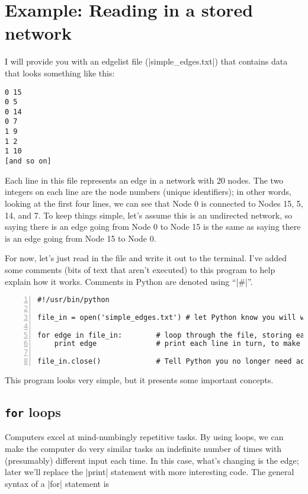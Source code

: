 \documentclass{article}
\begin{document}
\section{Example: Reading in a stored network}
\label{stored_net}
I will provide you with an edgelist file (|simple_edges.txt|) that contains data that looks something
like this:

\begin{Verbatim}
0 15                          
0 5                           
0 14                          
0 7                           
1 9                           
1 2                           
1 10                          
[and so on]
\end{Verbatim}

Each line in this file represents an edge in a network with 20 nodes.  The two integers on
each line are the node numbers (unique identifiers); in other words, looking at the first four lines, we can see that Node 0 is
connected to Nodes 15, 5, 14, and 7.  To keep things simple, let's assume this is an
undirected network, so saying there is an edge going from Node 0 to Node 15 is
the same as saying there is an edge going from Node 15 to Node 0.

For now, let's just read in the file and write it out to the terminal.  I've added some comments (bits of text that
aren't executed) to this program to help explain how it works. Comments in Python are denoted using ``|#|''.

\begin{Verbatim}[numbers=left, samepage=true]
#!/usr/bin/python

file_in = open('simple_edges.txt') # let Python know you will want to access the file

for edge in file_in:        # loop through the file, storing each line in turn in 'edge'
    print edge              # print each line in turn, to make sure everything's working

file_in.close()             # Tell Python you no longer need access
\end{Verbatim}
This program looks very simple, but it presents some important concepts.

\subsection{\texttt{for} loops}
Computers excel at mind-numbingly repetitive tasks.  By using loops, we can make the computer do very similar tasks an indefinite number of times 
with (presumably) different input each time.  In this case, what's changing is the edge; later we'll replace the |print| statement 
with more interesting code.  The general syntax of a |for| statement is\\
\end{document}
